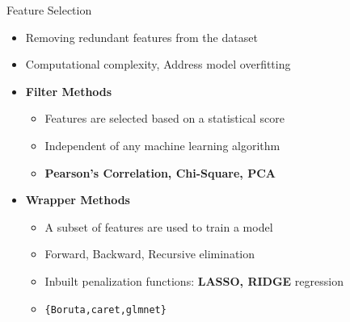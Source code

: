 \documentclass[12pt,ignorenonframetext,]{beamer}
\providecommand{\tightlist}{%
  \setlength{\itemsep}{0pt}\setlength{\parskip}{0pt}}
\begin{document}
\begin{frame}{Feature Selection}
\protect\hypertarget{feature-selection}{}

\begin{itemize}
\tightlist
\item
  Removing redundant features from the dataset \vspace{2mm}
\item
  Computational complexity, Address model overfitting \vspace{2mm}
\item
  \textbf{Filter Methods}

  \begin{itemize}
      \item Features are selected based on a statistical score
      \item Independent of any machine learning algorithm
      \item \textbf{Pearson’s Correlation, Chi-Square, PCA}
  \end{itemize}
   \vspace{2mm}
\item
  \textbf{Wrapper Methods}

  \begin{itemize}
      \item A subset of features are used to train a model
      \item Forward, Backward, Recursive elimination
      \item Inbuilt penalization functions: \textbf{LASSO, RIDGE} regression 
      \item \texttt{\{Boruta,caret,glmnet\}}
  \end{itemize}
\end{itemize}

\end{frame}
\end{document}
